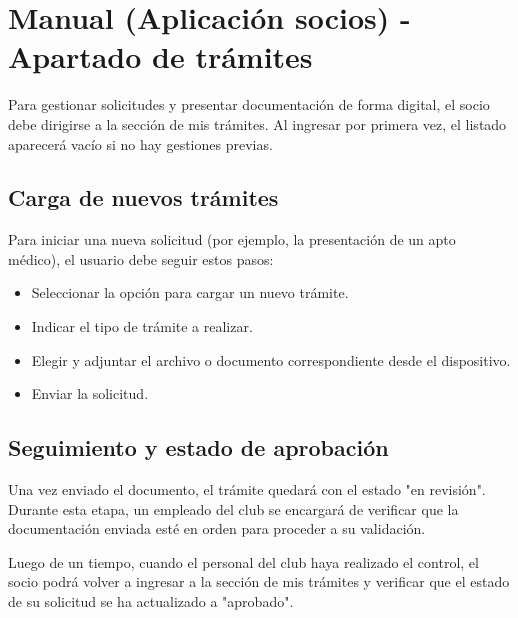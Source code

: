 \section{Manual (Aplicación socios) - Apartado de trámites}

Para gestionar solicitudes y presentar documentación de forma digital, el socio debe dirigirse a la sección de mis trámites. Al ingresar por primera vez, el listado aparecerá vacío si no hay gestiones previas.

\subsection{Carga de nuevos trámites}
Para iniciar una nueva solicitud (por ejemplo, la presentación de un apto médico), el usuario debe seguir estos pasos:
\begin{itemize}
    \item Seleccionar la opción para cargar un nuevo trámite.
    \item Indicar el tipo de trámite a realizar.
    \item Elegir y adjuntar el archivo o documento correspondiente desde el dispositivo.
    \item Enviar la solicitud.
\end{itemize}

\subsection{Seguimiento y estado de aprobación}
Una vez enviado el documento, el trámite quedará con el estado "en revisión". Durante esta etapa, un empleado del club se encargará de verificar que la documentación enviada esté en orden para proceder a su validación. 

Luego de un tiempo, cuando el personal del club haya realizado el control, el socio podrá volver a ingresar a la sección de mis trámites y verificar que el estado de su solicitud se ha actualizado a "aprobado".
